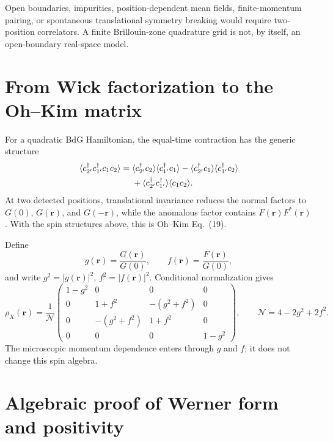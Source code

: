\documentclass[11pt]{article}
\begin{document}
Open boundaries, impurities, position-dependent mean fields, finite-momentum pairing, or spontaneous translational symmetry breaking would require two-position correlators. A finite Brillouin-zone quadrature grid is not, by itself, an open-boundary real-space model.

\section{From Wick factorization to the Oh--Kim matrix}

For a quadratic BdG Hamiltonian, the equal-time contraction has the generic structure
\begin{align}
\langle c_{2'}^{\dagger}c_{1'}^{\dagger}c_1c_2\rangle
={}&\langle c_{2'}^{\dagger}c_2\rangle\langle c_{1'}^{\dagger}c_1\rangle
-\langle c_{2'}^{\dagger}c_1\rangle\langle c_{1'}^{\dagger}c_2\rangle\notag\\
&+\langle c_{2'}^{\dagger}c_{1'}^{\dagger}\rangle\langle c_1c_2\rangle .
\end{align}
At two detected positions, translational invariance reduces the normal factors to $G(0)$, $G(\mathbf r)$, and $G(-\mathbf r)$, while the anomalous factor contains $F(\mathbf r)F^*(\mathbf r)$. With the spin structures above, this is Oh--Kim Eq.~(19).

Define
\begin{equation}
g(\mathbf r)=\frac{G(\mathbf r)}{G(0)},\qquad
f(\mathbf r)=\frac{F(\mathbf r)}{G(0)},
\end{equation}
and write $g^2=|g(\mathbf r)|^2$, $f^2=|f(\mathbf r)|^2$. Conditional normalization gives
\begin{equation}
\rho_X(\mathbf r)=\frac1{\mathcal N}
\begin{pmatrix}
1-g^2&0&0&0\\
0&1+f^2&-(g^2+f^2)&0\\
0&-(g^2+f^2)&1+f^2&0\\
0&0&0&1-g^2
\end{pmatrix},
\qquad \mathcal N=4-2g^2+2f^2.
\label{eq:X}
\end{equation}
The microscopic momentum dependence enters through $g$ and $f$; it does not change this spin algebra.

\section{Algebraic proof of Werner form and positivity}
\end{document}
